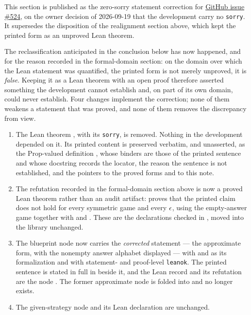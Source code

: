 \documentclass[11pt]{article}
\renewcommand{\ghissue}[1]{%
  \href{https://github.com/Dengnifer/MIPStarRE-QPBT/issues/#1}{GitHub issue \##1}}
\begin{document}
This section is published as the zero-sorry statement correction for
\ghissue{524}, on the owner decision of 2026-09-19 that the development carry
no \texttt{sorry}.  It supersedes the disposition of the realignment section
above, which kept the printed form as an unproved Lean theorem.

The reclassification anticipated in the conclusion below has now happened, and
for the reason recorded in the formal-domain section: on the domain over which
the Lean statement was quantified, the printed form is not merely unproved, it
is \emph{false}.  Keeping it as a Lean theorem with an open proof therefore
asserted something the development cannot establish and, on part of its own
domain, could never establish.  Four changes implement the correction; none of
them weakens a statement that was proved, and none of them removes the
discrepancy from view.

\begin{enumerate}
  \item The Lean theorem ,
  with its \texttt{sorry}, is removed.  Nothing in the development depended on
  it.  Its printed content is preserved verbatim, and unasserted, as the
  Prop-valued definition
  , whose binders are those
  of the printed sentence and whose docstring records the locator, the reason
  the sentence is not established, and the pointers to the proved forms and to
  this note.
  \item The refutation recorded in the formal-domain section above is now a
  proved Lean theorem rather than an audit artifact:
   proves that
  the printed claim does not hold for every symmetric game and every $\epsilon$,
  using the empty-answer game
   together with
   and
  .  These are the
  declarations checked in
  , moved into
  the library unchanged.
  \item The blueprint node  now carries the
  \emph{corrected} statement --- the approximate form, with the nonempty
  answer alphabet displayed --- with 
  and  as its
  formalization and with statement- and proof-level \texttt{leanok}.  The
  printed sentence is stated in full in 
  beside it, and the Lean record and its refutation are the node
  .  The former approximate node
   is folded into 
  and no longer exists.
  \item The given-strategy node  and
  its Lean declaration are unchanged.
\end{enumerate}
\end{document}
